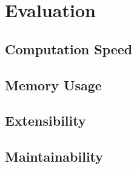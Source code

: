 \chapter{Evaluation}

\section{Computation Speed}

\section{Memory Usage}

\section{Extensibility}

\section{Maintainability}
